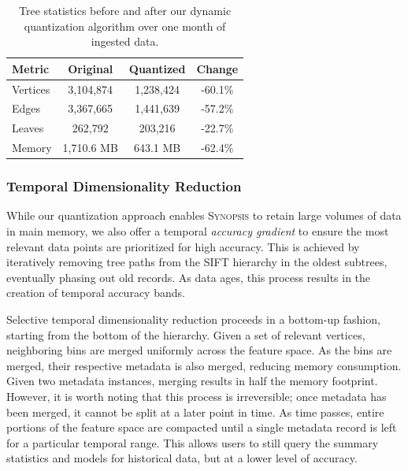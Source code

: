%
\begin{table}[h!]
    \renewcommand{\arraystretch}{1.2}
    \caption{Tree statistics before and after our dynamic quantization algorithm over one month of ingested data.\vspace{-1em}}
    \label{tbl:tree-stats}
    \begin{center}
        \begin{tabular}{|l|c|c|c|}
            \hline
            \textbf{Metric} & \textbf{Original} & \textbf{Quantized} & \textbf{Change} \\
            \hline
            Vertices & 3,104,874 & 1,238,424 & -60.1\% \\
            \hline
            Edges    & 3,367,665 & 1,441,639 & -57.2\% \\
            \hline
            Leaves   & 262,792   & 203,216   & -22.7\% \\
            \hline
            Memory   & 1,710.6 MB & 643.1 MB  & -62.4\% \\
            \hline
        \end{tabular}
    \end{center}
\end{table}

\subsubsection{Temporal Dimensionality Reduction}
While our quantization approach enables \textsc{Synopsis} to retain large volumes of data in main memory, we also offer a temporal \emph{accuracy gradient} to ensure the most relevant data points are prioritized for high accuracy. This is achieved by iteratively removing tree paths from the SIFT hierarchy in the oldest subtrees, eventually phasing out old records. As data ages, this process results in the creation of temporal accuracy bands.

Selective temporal dimensionality reduction proceeds in a bottom-up fashion, starting from the bottom of the hierarchy. Given a set of relevant vertices, neighboring bins are merged uniformly across the feature space. As the bins are merged, their respective metadata is also merged, reducing memory consumption. Given two metadata instances, merging results in half the memory footprint. However, it is worth noting that this process is irreversible; once metadata has been merged, it cannot be split at a later point in time. As time passes, entire portions of the feature space are compacted until a single metadata record is left for a particular temporal range. This allows users to still query the summary statistics and models for historical data, but at a lower level of accuracy.
